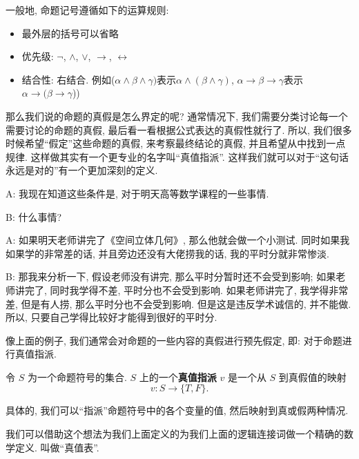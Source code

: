       \begin{definition}[命题符号的运算规则]
        一般地, 命题记号遵循如下的运算规则: 
        \begin{itemize}
            \setlength{\itemsep}{6pt}
            \item 最外层的括号可以省略
            \item 优先级: $\lnot$, $\land$, $\lor$, $\to$, $\leftrightarrow$
            \item 结合性: 右结合. 例如($\alpha \land \beta \land \gamma)$表示$\alpha \land (\beta \land \gamma)$,
              $\alpha \to \beta \to \gamma$表示$\alpha \to (\beta \to \gamma$))
          \end{itemize}
      \end{definition}

那么我们说的命题的真假是怎么界定的呢? 通常情况下, 我们需要分类讨论每一个需要讨论的命题的真假, 最后看一看根据公式表达的真假性就行了. 所以, 我们很多时候希望``假定''这些命题的真假, 来考察最终结论的真假, 并且希望从中找到一点规律. 这样做其实有一个更专业的名字叫``真值指派''. 这样我们就可以对于``这句话永远是对的''有一个更加深刻的定义. 

\begin{dialogue}
	A: 我现在知道这些条件是, 对于明天高等数学课程的一些事情. 
	
	B: 什么事情? 
	
	A: 如果明天老师讲完了《空间立体几何》, 那么他就会做一个小测试. 同时如果我如果学的非常差的话, 并且旁边还没有大佬捞我的话, 我的平时分就非常惨淡. 
	
	B: 那我来分析一下, 假设老师没有讲完, 那么平时分暂时还不会受到影响; 如果老师讲完了, 同时我学得不差, 平时分也不会受到影响. 如果老师讲完了, 我学得非常差, 但是有人捞, 那么平时分也不会受到影响. 但是这是违反学术诚信的, 并不能做. 所以, 只要自己学得比较好才能得到很好的平时分. 
\end{dialogue}

像上面的例子, 我们通常会对命题的一些内容的真假进行预先假定, 即: 对于命题进行真值指派. 

	\begin{definition}[真值指派 ($v$)]
        令 $S$ 为一个命题符号的集合. 
        $S$ 上的一个{\bf 真值指派} $v$ 是一个从 $S$ 到真假值的映射
        \[
          v: S \to \{T, F\}.
        \]
    \end{definition}

具体的, 我们可以``指派''命题符号中的各个变量的值, 然后映射到真或假两种情况. 

我们可以借助这个想法为我们上面定义的为我们上面的逻辑连接词做一个精确的数学定义. 叫做``真值表''. 

